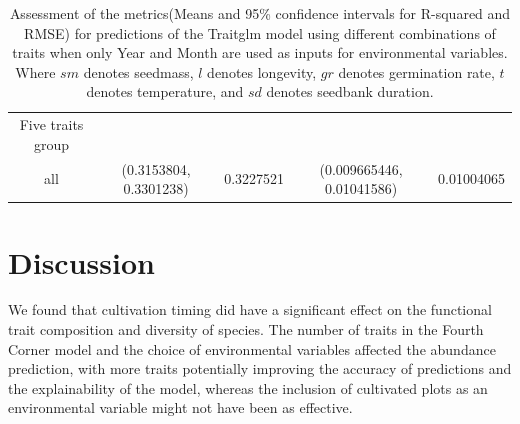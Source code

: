 \documentclass[a4paper, 11, margin=2cm]{article}
\begin{document}
\begin{table}[H]
\begin{center}
{{\begin{tabular}{||c c c c c||}
            Five traits group \\
            all        & (0.3153804, 0.3301238) & 0.3227521 & (0.009665446, 0.01041586) & 0.01004065 \\
          \end{tabular}
          }
          }
          \caption{Assessment of the metrics(Means and 95\% confidence intervals for R-squared and RMSE) for predictions of the Traitglm model using different combinations of traits when only Year and Month are used as inputs for environmental variables. Where $sm$ denotes seedmass, $l$ denotes longevity, $gr$ denotes germination rate, $t$ denotes temperature, and $sd$ denotes seedbank duration.}
        \end{center}
      \end{table}


    \section{Discussion}
    
    We found that cultivation timing did have a significant effect on the functional trait composition and diversity of species. The number of traits in the Fourth Corner model and the choice of environmental variables affected the abundance prediction, with more traits potentially improving the accuracy of predictions and the explainability of the model, whereas the inclusion of cultivated plots as an environmental variable might not have been as effective.
\end{document}
